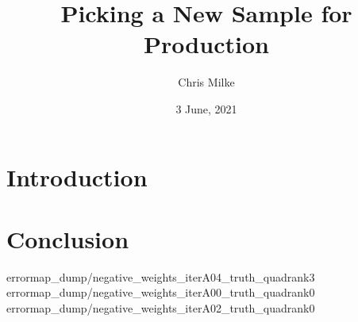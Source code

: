 \documentclass{beamer}
\begin{document}
    \title{Picking a New Sample for Production}
    \author{Chris Milke}
    \date{3 June, 2021}

    \frame{\titlepage}

    \section{Introduction}
    
    

    

    
    


    \section{Conclusion}
    {errormap_dump/negative_weights_iterA04_truth_quadrank3}
    {errormap_dump/negative_weights_iterA00_truth_quadrank0}
    {errormap_dump/negative_weights_iterA02_truth_quadrank0}

\end{document}
